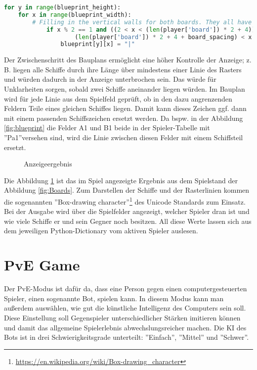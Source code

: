 \documentclass{article}
\begin{document}
\begin{lstlisting}[language=Python, caption =Beispiel zum Einfügen von bestimmten Teilen des Spielfeldrasters, label=lst:Grid example]
for y in range(blueprint_height):
    for x in range(blueprint_width):
        # Filling in the vertical walls for both boards. They all have odd x coordinate
            if x % 2 == 1 and ((2 < x < (len(player['board']) * 2 + 4)) or (
                    (len(player['board']) * 2 + 4 + board_spacing) < x < blueprint_width)):
                blueprint[y][x] = "|"
\end{lstlisting}

\par
    Der Zwischenschritt des Bauplans ermöglicht eine höher Kontrolle der Anzeige; z. B. liegen alle Schiffe durch ihre Länge über mindestens einer Linie des Rasters und würden dadurch in der Anzeige unterbrochen sein. Das würde für Unklarheiten sorgen, sobald zwei Schiffe aneinander liegen würden. Im Bauplan wird für jede Linie aus dem Spielfeld geprüft, ob in den dazu angrenzenden Feldern Teile eines gleichen Schiffes liegen. Damit kann dieses Zeichen ggf. dann mit einem passenden Schiffszeichen ersetzt werden. Da bspw. in der Abbildung \ref{fig:blueprint} die Felder A1 und B1 beide in der Spieler-Tabelle mit ''Pa1''versehen sind, wird die Linie zwischen diesen Felder mit einem Schiffsteil ersetzt.

\begin{figure}[H]
    \centering
    
    \caption{Anzeigeergebnis}
    \label{fig:Result}
\end{figure}

    Die Abbildung \ref{fig:Result} ist das im Spiel angezeigte Ergebnis aus dem Spielstand der Abbildung \ref{fig:Boards}. Zum Darstellen der Schiffe und der Rasterlinien kommen die sogenannten ''Box-drawing character''\footnote{\url{https://en.wikipedia.org/wiki/Box-drawing_character}} des Unicode Standards zum Einsatz. Bei der Ausgabe wird über die Spielfelder angezeigt, welcher Spieler dran ist und wie viele Schiffe er und sein Gegner noch besitzen. All diese Werte lassen sich aus dem jeweiligen Python-Dictionary vom aktiven Spieler auslesen.


\section{PvE Game}
       Der PvE-Modus ist dafür da, dass eine Person gegen einen computergesteuerten Spieler, einen sogenannte Bot, spielen kann. In diesem Modus kann man außerdem auswählen, wie gut die künstliche Intelligenz des Computers sein soll. Diese Einstellung soll Gegenspieler unterschiedlicher Stärken imitieren können und damit das allgemeine Spielerlebnis abwechslungsreicher machen. Die KI des Bots ist in drei Schwierigkeitsgrade unterteilt: ''Einfach'', ''Mittel'' und ''Schwer''.
\end{document}
